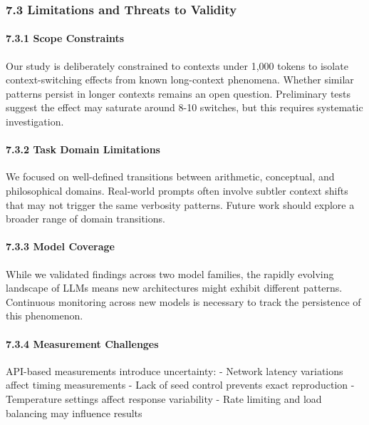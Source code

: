 \documentclass[
  11pt]{article}
\begin{document}
\subsubsection{7.3 Limitations and Threats to
Validity}\label{limitations-and-threats-to-validity}

\paragraph{7.3.1 Scope Constraints}\label{scope-constraints}

Our study is deliberately constrained to contexts under 1,000 tokens to
isolate context-switching effects from known long-context phenomena.
Whether similar patterns persist in longer contexts remains an open
question. Preliminary tests suggest the effect may saturate around 8-10
switches, but this requires systematic investigation.

\paragraph{7.3.2 Task Domain Limitations}\label{task-domain-limitations}

We focused on well-defined transitions between arithmetic, conceptual,
and philosophical domains. Real-world prompts often involve subtler
context shifts that may not trigger the same verbosity patterns. Future
work should explore a broader range of domain transitions.

\paragraph{7.3.3 Model Coverage}\label{model-coverage}

While we validated findings across two model families, the rapidly
evolving landscape of LLMs means new architectures might exhibit
different patterns. Continuous monitoring across new models is necessary
to track the persistence of this phenomenon.

\paragraph{7.3.4 Measurement Challenges}\label{measurement-challenges}

API-based measurements introduce uncertainty: - Network latency
variations affect timing measurements - Lack of seed control prevents
exact reproduction - Temperature settings affect response variability -
Rate limiting and load balancing may influence results
\end{document}
